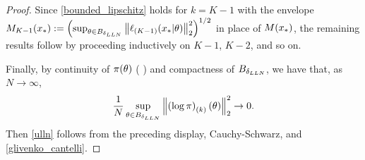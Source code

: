 \begin{lem}
\begin{proof}
Since \eqref{bounded_lipschitz} holds for $k=K-1$ with the envelope
$M_{K-1}(x_{*}) := \left(\sup_{\theta \in B_{\delta_{LLN}}}
\left\Vert \ell_{(K-1)}(x_{*} \vert \theta)\right\Vert^2_2\right)^{1/2}$ in place of $M(x_{*})$,
the remaining results follow
by proceeding inductively on $K-1$, $K-2$, and so on.

Finally, by continuity of $\pi(\theta)$
( ) and compactness of
$B_{\delta_{LLN}}$, we have that, as $N \rightarrow \infty$,
$$
\frac{1}{N} \sup_{\theta \in B_{\delta_{LLN}}} \left\Vert \left(\log\pi\right)_{(k)}(\theta)\right\Vert_2^2  \rightarrow 0.
$$
Then \eqref{ulln} follows from the preceding display, Cauchy-Schwarz, and \eqref{glivenko_cantelli}.
%
\end{proof}
%

\end{lem}
